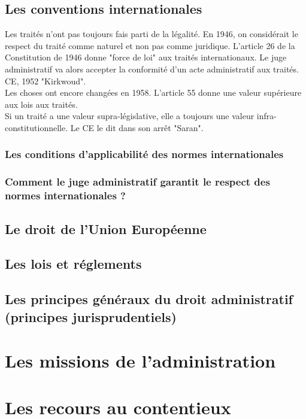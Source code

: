 \documentclass[10pt, a4paper, openany]{book}
\begin{document}
\chapter{Les conventions internationales}

Les traités n'ont pas toujours fais parti de la légalité. En 1946, on considérait le respect du traité comme naturel et non pas comme juridique. L'article 26 de la Constitution de 1946 donne "force de loi" aux traités internationaux. Le juge administratif va alors accepter la conformité d'un acte administratif aux traités. CE, 1952 "Kirkwoud". \\
Les choses ont encore changées en 1958. L'article 55 donne une valeur supérieure aux lois aux traités. \\
Si un traité a une valeur supra-législative, elle a toujours une valeur infra-constitutionnelle. Le CE le dit dans son arrêt "Saran". 

\section{Les conditions d'applicabilité des normes internationales}

\section{Comment le juge administratif garantit le respect des normes internationales ?}





















\chapter{Le droit de l'Union Européenne}

\chapter{Les lois et réglements}

\chapter{Les principes généraux du droit administratif (principes jurisprudentiels)}

\part{Les missions de l'administration}


\part{Les recours au contentieux}
\end{document}
